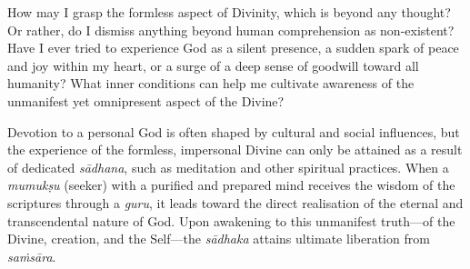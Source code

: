\newpage
\begin{mananam}{}
\normalfont\mananamtext How may I grasp the formless aspect of Divinity, which is beyond any thought? Or rather, do I dismiss anything beyond human comprehension as non-existent?
Have I ever tried to experience God as a silent presence, a sudden spark of peace and joy within my heart, or a surge of a deep sense of goodwill toward all humanity?
What inner conditions can help me cultivate awareness of the unmanifest yet omnipresent aspect of the Divine?
\end{mananam}
\sreflect
\begin{inspiration}{}
\normalfont\mananamtext Devotion to a personal God is often shaped by cultural and social influences, but the experience of the formless, impersonal Divine can only be attained as a result of dedicated \emph{sādhana}, such as meditation and other spiritual practices. When a \emph{mumukṣu} (seeker) with a purified and prepared mind receives the wisdom of the scriptures through a \emph{guru}, it leads toward the direct realisation of the eternal and transcendental nature of God. Upon awakening to this unmanifest truth—of the Divine, creation, and the Self—the \emph{sādhaka} attains ultimate liberation from \emph{saṁsāra}. 
\end{inspiration}
\newpage

